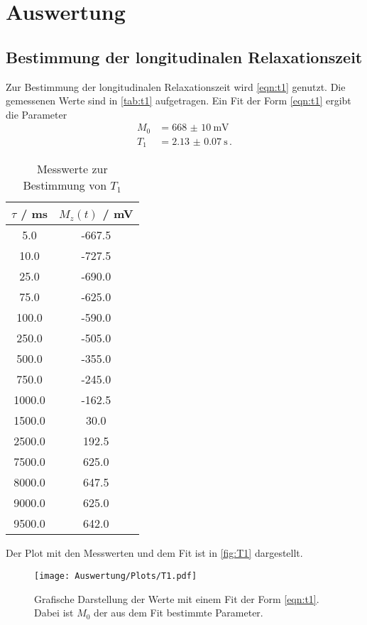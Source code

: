 \section{Auswertung}
\subsection{Bestimmung der longitudinalen Relaxationszeit}
Zur Bestimmung der longitudinalen Relaxationszeit wird \eqref{eqn:t1} genutzt.
Die gemessenen Werte sind in \autoref{tab:t1} aufgetragen.
Ein Fit der Form \eqref{eqn:t1} ergibt die Parameter
\begin{align}
  M_0 &= \SI{668(10)}{\mV} \label{eqn:M0_T1} \\
  T_1 &= \SI{2.13(7)}{\s} \label{eqn:T1} \, .
\end{align}

\begin{table}
  \centering
  \caption{Messwerte zur Bestimmung von $T_1$}
  \label{tab:t1}
  \begin{tabular}{c c}
    \toprule
    $\tau$ / \si{\ms} & $M_z(t)$ / \si{\mV} \\
    \midrule
    5.0 & -667.5 \\
    10.0 & -727.5 \\
    25.0 & -690.0 \\
    75.0 & -625.0 \\
    100.0 & -590.0 \\
    250.0 & -505.0 \\
    500.0 & -355.0 \\
    750.0 & -245.0 \\
    1000.0 & -162.5 \\
    1500.0 & 30.0 \\
    2500.0 & 192.5 \\
    7500.0 & 625.0 \\
    8000.0 & 647.5 \\
    9000.0 & 625.0 \\
    9500.0 & 642.0 \\
    \bottomrule
  \end{tabular}
\end{table}
Der Plot mit den Messwerten und dem Fit ist in \autoref{fig:T1} dargestellt.

\begin{figure}
  \centering
  \texttt{[image: Auswertung/Plots/T1.pdf]}
  \caption{Grafische Darstellung der Werte mit einem Fit der Form \eqref{eqn:t1}.
  Dabei ist $M_0$ der aus dem Fit bestimmte Parameter.}
  \label{fig:T1}
\end{figure}

